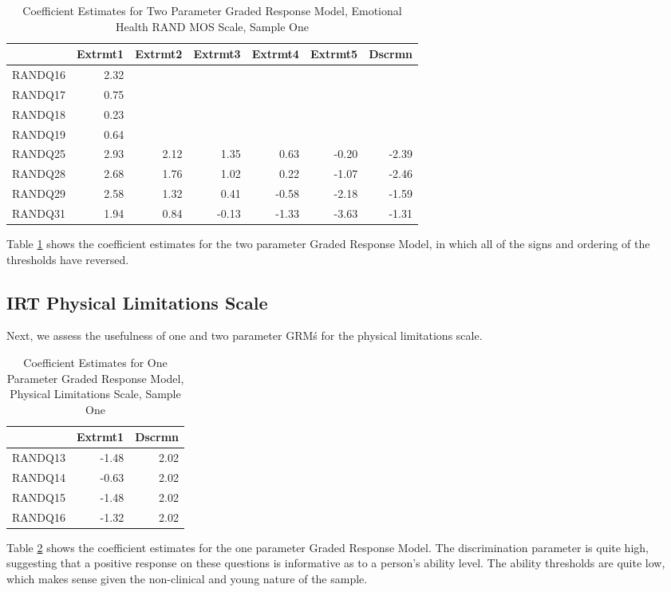 \documentclass{article}
\begin{document}
\begin{table}[ht]
\centering
\begin{tabular}{rrrrrrr}
  \hline
 & Extrmt1 & Extrmt2 & Extrmt3 & Extrmt4 & Extrmt5 & Dscrmn \\ 
  \hline
RANDQ16 & 2.32 &  &  &  &  &  \\ 
  RANDQ17 & 0.75 &  &  &  &  &  \\ 
  RANDQ18 & 0.23 &  &  &  &  &  \\ 
  RANDQ19 & 0.64 &  &  &  &  &  \\ 
  RANDQ25 & 2.93 & 2.12 & 1.35 & 0.63 & -0.20 & -2.39 \\ 
  RANDQ28 & 2.68 & 1.76 & 1.02 & 0.22 & -1.07 & -2.46 \\ 
  RANDQ29 & 2.58 & 1.32 & 0.41 & -0.58 & -2.18 & -1.59 \\ 
  RANDQ31 & 1.94 & 0.84 & -0.13 & -1.33 & -3.63 & -1.31 \\ 
   \hline
\end{tabular}
\caption{Coefficient Estimates for Two Parameter Graded Response Model, Emotional Health RAND MOS Scale, Sample One} 
\label{tab:hom1emhealthgrm2pl}
\end{table}Table \ref{tab:hom1emhealthgrm2pl} shows the coefficient estimates for the two parameter Graded Response Model, in which all of the signs and ordering of the thresholds have reversed. 




\subsection{IRT Physical Limitations Scale}
\label{sec:irt-phys-limit}



Next, we assess the usefulness of one and two parameter GRM\'s for the physical limitations scale. 


\begin{table}[ht]
\centering
\begin{tabular}{rrr}
  \hline
 & Extrmt1 & Dscrmn \\ 
  \hline
RANDQ13 & -1.48 & 2.02 \\ 
  RANDQ14 & -0.63 & 2.02 \\ 
  RANDQ15 & -1.48 & 2.02 \\ 
  RANDQ16 & -1.32 & 2.02 \\ 
   \hline
\end{tabular}
\caption{Coefficient Estimates for One Parameter Graded Response Model, Physical Limitations Scale, Sample One} 
\label{tab:hom1physlimgrm1pl}
\end{table}
Table \ref{tab:hom1physlimgrm1pl} shows the coefficient estimates for the one parameter Graded Response Model. The discrimination parameter is quite high, suggesting that a positive response on these questions is informative as to a person's ability level. The ability thresholds are quite low, which makes sense given the non-clinical and young nature of the sample. 
\end{document}
